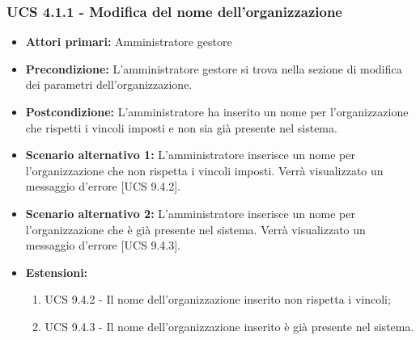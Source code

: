 \subsubsection{UCS 4.1.1 - Modifica del nome dell'organizzazione}%
\begin{itemize}
\item \textbf{Attori primari:} Amministratore gestore
\item \textbf{Precondizione:} L'amministratore gestore si trova nella sezione di modifica dei parametri dell'organizzazione.
\item \textbf{Postcondizione:} L'amministratore ha inserito un nome per l'organizzazione che rispetti i vincoli imposti e non sia già presente nel sistema.
\item \textbf{Scenario alternativo 1:} L'amministratore inserisce un nome per l'organizzazione che non rispetta i vincoli imposti. Verrà visualizzato un messaggio d'errore [UCS 9.4.2].
\item \textbf{Scenario alternativo 2:} L'amministratore inserisce un nome per l'organizzazione che è già presente nel sistema. Verrà visualizzato un messaggio d'errore [UCS 9.4.3].
\item \textbf{Estensioni:}
\begin{enumerate}
    \item UCS 9.4.2 - Il nome dell'organizzazione inserito non rispetta i vincoli;
    \item UCS 9.4.3 - Il nome dell'organizzazione inserito è già presente nel sistema.
\end{enumerate}
\end{itemize}


